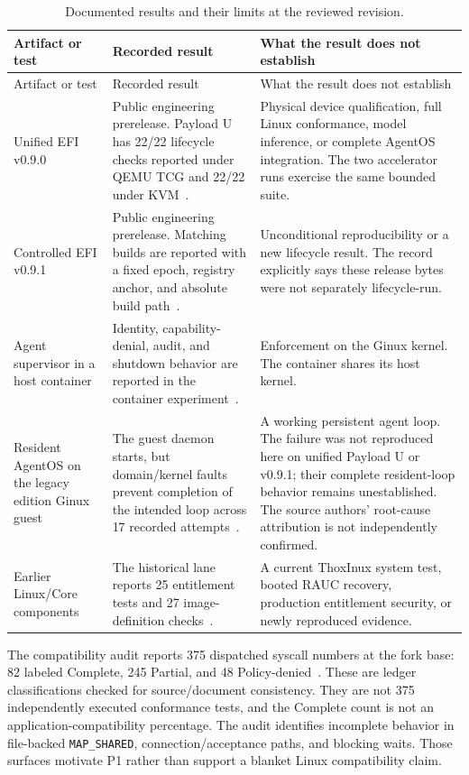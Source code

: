 \documentclass[11pt,a4paper]{article}
\newcommand{\code}[1]{\texttt{#1}}
\begin{document}
\begin{longtable}{P{0.22\textwidth}P{0.37\textwidth}P{0.34\textwidth}}
\caption{Documented results and their limits at the reviewed revision.}\label{tab:status}\\
\toprule
Artifact or test & Recorded result & What the result does not establish \\
\midrule
\endfirsthead
\toprule Artifact or test & Recorded result & What the result does not establish \\
\midrule
\endhead
Unified EFI v0.9.0 & Public engineering prerelease. Payload U has 22/22 lifecycle checks reported under QEMU TCG and 22/22 under KVM~\cite{release09,waves}. & Physical device qualification, full Linux conformance, model inference, or complete AgentOS integration. The two accelerator runs exercise the same bounded suite. \\
Controlled EFI v0.9.1 & Public engineering prerelease. Matching builds are reported with a fixed epoch, registry anchor, and absolute build path~\cite{release091,releasebuild}. & Unconditional reproducibility or a new lifecycle result. The record explicitly says these release bytes were not separately lifecycle-run. \\
Agent supervisor in a host container & Identity, capability-denial, audit, and shutdown behavior are reported in the container experiment~\cite{waves}. & Enforcement on the Ginux kernel. The container shares its host kernel. \\
Resident AgentOS on the legacy edition Ginux guest & The guest daemon starts, but domain/kernel faults prevent completion of the intended loop across 17 recorded attempts~\cite{guestfailure,waves}. & A working persistent agent loop. The failure was not reproduced here on unified Payload U or v0.9.1; their complete resident-loop behavior remains unestablished. The source authors' root-cause attribution is not independently confirmed. \\
Earlier Linux/Core components & The historical lane reports 25 entitlement tests and 27 image-definition checks~\cite{core,historical}. & A current ThoxInux system test, booted RAUC recovery, production entitlement security, or newly reproduced evidence. \\
\bottomrule
\end{longtable}

The compatibility audit reports 375 dispatched syscall numbers at the fork base: 82 labeled Complete, 245 Partial, and 48 Policy-denied~\cite{compatibility}. These are ledger classifications checked for source/document consistency. They are not 375 independently executed conformance tests, and the Complete count is not an application-compatibility percentage. The audit identifies incomplete behavior in file-backed \code{MAP\_SHARED}, connection/acceptance paths, and blocking waits. Those surfaces motivate P1 rather than support a blanket Linux compatibility claim.
\end{document}
